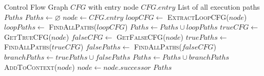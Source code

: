 \documentclass[letterpaper]{article} %
\begin{document}
\begin{algorithm}[t]
\caption{FindAllPaths in a Control Flow Graph (CFG)}
\label{alg:findallpaths}
\begin{algorithmic}[1]
\REQUIRE Control Flow Graph $CFG$ with entry node $CFG.entry$
\ENSURE List of all execution paths $Paths$
\STATE $Paths \gets \varnothing$
\STATE $node \gets CFG.entry$
            \STATE $loopCFG \gets$ \textsc{ExtractLoopCFG}($node$)
            \STATE $loopPaths \gets$ \textsc{FindAllPaths}($loopCFG$)
            \STATE $Paths \gets Paths \cup loopPaths$
        \ELSE 
            \STATE $trueCFG \gets$ \textsc{GetTrueCFG}($node$)
            \STATE $falseCFG \gets$ \textsc{GetFalseCFG}($node$)
            \STATE $truePaths \gets$ \textsc{FindAllPaths}($trueCFG$)
            \STATE $falsePaths \gets$ \textsc{FindAllPaths}($falseCFG$)
            \STATE $branchPaths \gets truePaths \cup falsePaths$
            \STATE $Paths \gets Paths \cup branchPaths$
        \ENDIF
        \STATE \textsc{AddToContext}($node$)
    \ENDIF
    \STATE $node \gets node.successor$
\ENDWHILE
\RETURN $Paths$
\end{algorithmic}
\end{algorithm}
\end{document}

